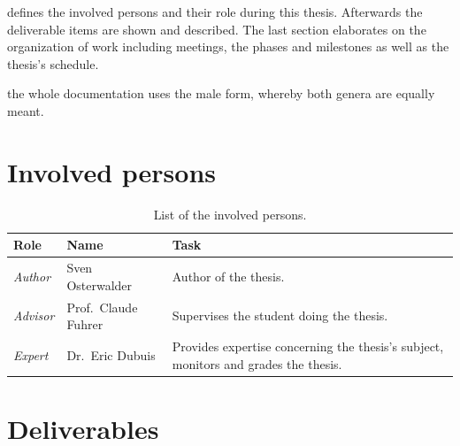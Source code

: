 \documentclass[%
    a4paper,
    nobib,   %
    openany  %
]{tufte-book}
\begin{document}
 defines the involved persons and their role
during this thesis. Afterwards the deliverable items are shown and described.
The last section elaborates on the organization of work including meetings, the
phases and milestones as well as the thesis's schedule.

 the whole documentation uses the male form, whereby both
genera are equally meant.

\section{Involved persons}
\label{sec:involved_persons}

\begin{table}[h]
  \caption{List of the involved persons.}
  \begin{tabularx}{\textwidth}{llX}
    \toprule
    \textbf{Role} & \textbf{Name} & \textbf{Task} \\
    \midrule
    \textit{Author}  & Sven Osterwalder\protect\footnotemark[1]{} & Author of the thesis.\\
    \textit{Advisor} & Prof.\ Claude Fuhrer\protect\footnotemark[2]{} & Supervises the student doing the thesis.\\
    \textit{Expert}  & Dr.\ Eric Dubuis\protect\footnotemark[3]{}     & Provides expertise concerning the thesis's subject, monitors and grades the thesis.\\
    \bottomrule
  \end{tabularx}
\end{table}

\newpage{}

\section{Deliverables}
\label{sec:deliverables}
\end{document}

